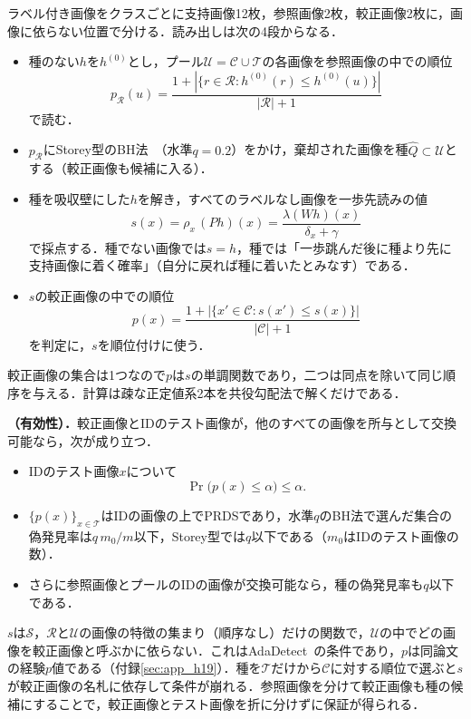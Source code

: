ラベル付き画像をクラスごとに支持画像12枚，参照画像2枚，較正画像2枚に，画像に依らない位置で分ける．読み出しは次の4段からなる．
\begin{itemize}
\item[(1)] 種のない$h$を$h^{(0)}$とし，プール$\mathcal{U}=\mathcal{C}\cup\mathcal{T}$の各画像を参照画像の中での順位
\begin{equation*}
p_{\mathcal{R}}(u)=\frac{1+|\{r\in\mathcal{R}:h^{(0)}(r)\le h^{(0)}(u)\}|}{|\mathcal{R}|+1}
\end{equation*}
で読む．
\item[(2)] $p_{\mathcal{R}}$にStorey型のBH法~\cite{benjamini1995bh,storey2002}（水準$q{=}0.2$）をかけ，棄却された画像を種$\hat{Q}\subset\mathcal{U}$とする（較正画像も候補に入る）．
\item[(3)] 種を吸収壁にした$h$を解き，すべてのラベルなし画像を一歩先読みの値
\begin{equation}
s(x)=\rho_x\,(Ph)(x)=\frac{\lambda(Wh)(x)}{\delta_x+\gamma}
\label{eq:s}
\end{equation}
で採点する．種でない画像では$s=h$，種では「一歩跳んだ後に種より先に支持画像に着く確率」（自分に戻れば種に着いたとみなす）である．
\item[(4)] $s$の較正画像の中での順位
\begin{equation}
p(x)=\frac{1+|\{x'\in\mathcal{C}:s(x')\le s(x)\}|}{|\mathcal{C}|+1}
\label{eq:p}
\end{equation}
を判定に，$s$を順位付けに使う．
\end{itemize}
較正画像の集合は1つなので$p$は$s$の単調関数であり，二つは同点を除いて同じ順序を与える．計算は疎な正定値系2本を共役勾配法で解くだけである．

\appblock
\textbf{\TValid（有効性）．}較正画像とIDのテスト画像が，他のすべての画像を所与として交換可能なら，次が成り立つ．
\begin{itemize}
\item[(i)] IDのテスト画像$x$について
\begin{equation*}
\Pr\big(p(x)\le\alpha\big)\le\alpha .
\end{equation*}
\item[(ii)] $\{p(x)\}_{x\in\mathcal{T}}$はIDの画像の上でPRDSであり，水準$q$のBH法で選んだ集合の偽発見率は$q\,m_0/m$以下，Storey型では$q$以下である（$m_0$はIDのテスト画像の数）．
\item[(iii)] さらに参照画像とプールのIDの画像が交換可能なら，種の偽発見率も$q$以下である．
\end{itemize}
$s$は$\mathcal{S}$，$\mathcal{R}$と$\mathcal{U}$の画像の特徴の集まり（順序なし）だけの関数で，$\mathcal{U}$の中でどの画像を較正画像と呼ぶかに依らない．これはAdaDetect~\cite{marandon2024adadetect}の条件であり，$p$は同論文の経験$p$値である（付録\ref{sec:app_h19}）．種を$\mathcal{T}$だけから$\mathcal{C}$に対する順位で選ぶと$s$が較正画像の名札に依存して条件が崩れる．参照画像を分けて較正画像も種の候補にすることで，較正画像とテスト画像を折に分けずに保証が得られる．
